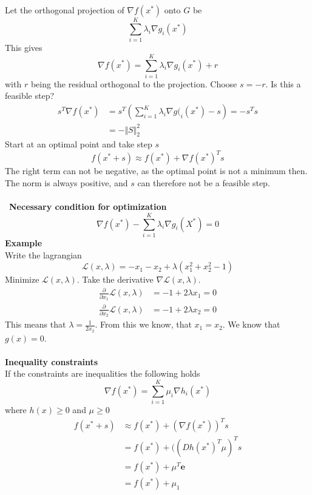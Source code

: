 \documentclass[12pt,a4paper]{report}
\begin{document}
Let the orthogonal projection of $\nabla f(x^*)$ onto $G$ be
\begin{equation}
\sum_{i=1}^K\lambda_i\nabla g_i(x^*)
\end{equation}
This gives
\begin{equation}
\nabla f(x^*)=\sum_{i=1}^K\lambda_i\nabla g_i(x^*)+r
\end{equation}
with $r$ being the residual orthogonal to the projection.
Choose $s=-r$. Is this a feasible step?
\begin{align*}
s^T\nabla f(x^*)&=s^T\left(\sum_{i=1}^K\lambda_i\nabla g(_i(x^*)-s\right)=-s^Ts\\
&=-\Vert S\Vert^2_2
\end{align*}
Start at an optimal point and take step $s$
\begin{equation}
f(x^*+s)\approx f(x^*)+\nabla f(x^*)^Ts
\end{equation}
The right term can not be negative, as the optimal point is not a minimum then. The norm is always positive, and $s$ can therefore not be a feasible step.\\\\\
\textbf{Necessary condition for optimization}
\begin{equation}
\nabla f(x^*)-\sum_{i=1}^K\lambda_i\nabla g_i(X^*)=0
\end{equation}
\textbf{Example}\\
Write the lagrangian
\begin{equation}
\mathcal{L}(x,\lambda)=-x_1-x_2+\lambda(x_1^2+x_2^2-1)
\end{equation}
Minimize $\mathcal{L}(x,\lambda)$. Take the derivative $\nabla \mathcal{L}(x,\lambda)$.
\begin{align*}
\frac{\partial}{\partial x_1}\mathcal{L}(x,\lambda)&=-1+2\lambda x_1=0\\
\frac{\partial}{\partial x_2}\mathcal{L}(x,\lambda)&=-1+2\lambda x_2=0
\end{align*}
This means that $\lambda=\frac{1}{2x_2}$.
From this we know, that $x_1=x_2$. We know that $g(x)=0$.\\\\
\textbf{Inequality constraints}\\
If the constraints are inequalities the following holds
\begin{equation}
\nabla f(x^*)=\sum_{i=1}^K\mu_i\nabla h_i(x^*)
\end{equation}
where $h(x)\geq0$ and $\mu\geq 0$
\begin{align*}
f(x^*+s)&\approx f(x^*)+(\nabla f(x^*))^Ts\\
&=f(x^*)+((Dh(x^*)^T\mu)^Ts\\
&=f(x^*)+\mu^T\mathbf{e}\\
&=f(x^*)+\mu_1
\end{align*}
\end{document}
